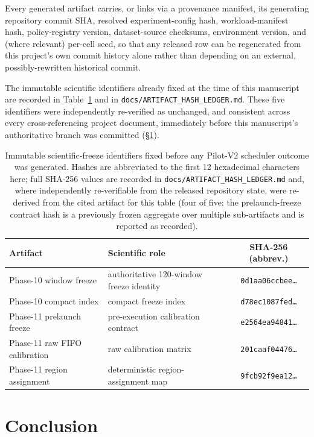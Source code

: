 \documentclass[sn-basic,Numbered,pdflatex]{sn-jnl}
\begin{document}
Every generated artifact carries, or links via a provenance manifest, its
generating repository commit SHA,
resolved experiment-config hash, workload-manifest hash, policy-registry
version, dataset-source checksums, environment version, and (where
relevant) per-cell seed, so that any released row can be regenerated from
this project's own commit history alone rather than depending on an
external, possibly-rewritten historical commit.

The immutable scientific identifiers already fixed at the time of this
manuscript are recorded in Table~\ref{tab:hashes} and in
\texttt{docs/ARTIFACT\_HASH\_LEDGER.md}. These five identifiers were
independently re-verified as unchanged, and consistent across every
cross-referencing project document, immediately before this manuscript's
authoritative branch was committed (\S\ref{sec:conclusion}).

\begin{table}[t]
\centering
\caption{Immutable scientific-freeze identifiers fixed before any Pilot-V2
scheduler outcome was generated. Hashes are abbreviated to the first 12
hexadecimal characters here; full SHA-256 values are recorded in
\texttt{docs/ARTIFACT\_HASH\_LEDGER.md} and, where independently
re-verifiable from the released repository state, were re-derived from the
cited artifact for this table (four of five; the prelaunch-freeze contract
hash is a previously frozen aggregate over multiple sub-artifacts and is
reported as recorded).}
\label{tab:hashes}
\begin{tabular}{llc}
\toprule
Artifact & Scientific role & SHA-256 (abbrev.) \\
\midrule
Phase-10 window freeze & authoritative 120-window freeze identity & \texttt{0d1aa06ccbee\ldots} \\
Phase-10 compact index & compact freeze index & \texttt{d78ec1087fed\ldots} \\
Phase-11 prelaunch freeze & pre-execution calibration contract & \texttt{e2564ea94841\ldots} \\
Phase-11 raw FIFO calibration & raw calibration matrix & \texttt{201caaf04476\ldots} \\
Phase-11 region assignment & deterministic region-assignment map & \texttt{9fcb92f9ea12\ldots} \\
\bottomrule
\end{tabular}
\end{table}

\section{Conclusion}
\label{sec:conclusion}
\end{document}
